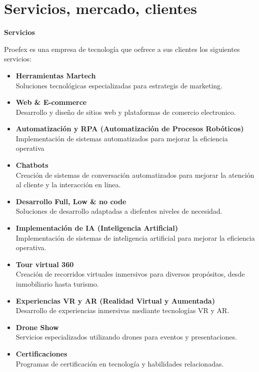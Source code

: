 \section{Servicios, mercado, clientes}
\label{sec:productos} 

\textbf{Servicios}

Proefex es una empresa de tecnología que oefrece a sus clientes los siguientes servicios:

\begin{itemize}
	\item \textbf{Herramientas Martech} \\
		Soluciones tecnológicas especializadas para estrategis de marketing.
	\item \textbf{Web \& E-commerce} \\
        Desarrollo y diseño de sitios web y plataformas de comercio electronico.
	\item \textbf{Automatización y RPA (Automatización de Procesos Robóticos)} \\
		Implementación de sistemas automatizados para mejorar la eficiencia operativa
	\item \textbf{Chatbots}\\
		Creación de sistemas de conversación automatizados para mejorar la atención al
		cliente y la interacción en linea.
	\item \textbf{Desarrollo Full, Low \& no code} \\
		Soluciones de desarrollo adaptadas a diefentes niveles de necesidad.
	\item \textbf{Implementación de IA (Inteligencia Artificial)} \\
        Implementación de sistemas de inteligencia artificial para mejorar la eficiencia operativa.
	\item \textbf{Tour virtual 360} \\
		Creación de recorridos virtuales inmersivos para diversos propósitos, desde inmobiliario hasta turismo.
	\item \textbf{Experiencias VR y AR (Realidad Virtual y Aumentada)}\\
		Desarrollo de experiencias inmersivas mediante tecnologías VR y AR.
	\item \textbf{Drone Show} \\
		Servicios especializados utilizando drones para eventos y presentaciones.
	\item \textbf{Certificaciones}\\
		Programas de certificación en tecnología y habilidades relacionadas.
\end{itemize}

